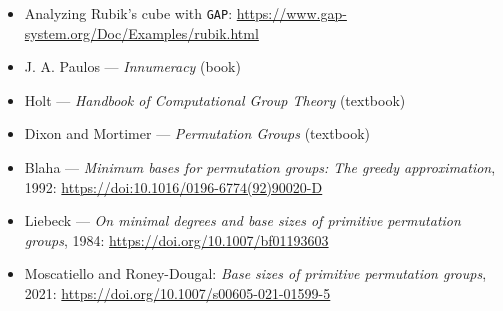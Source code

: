 \documentclass{beamer}
\begin{document}
\begin{slide}
    \small
    \begin{itemize}
        \item Analyzing Rubik's cube with \texttt{GAP}: \url{https://www.gap-system.org/Doc/Examples/rubik.html}
        \item J. A. Paulos --- \textit{Innumeracy} (book)
        \item Holt --- \textit{Handbook of Computational Group Theory} (textbook)
        \item Dixon and Mortimer --- \textit{Permutation Groups} (textbook)
        \item Blaha --- \textit{Minimum bases for permutation groups: The greedy approximation}, 1992: \url{https://doi:10.1016/0196-6774(92)90020-D}
        \item Liebeck --- \textit{On minimal degrees and base sizes of primitive permutation groups}, 1984: \url{https://doi.org/10.1007/bf01193603}
        \item Moscatiello and Roney-Dougal: \textit{Base sizes of primitive permutation groups}, 2021: \url{https://doi.org/10.1007/s00605-021-01599-5}
    \end{itemize}
\end{slide}


\end{document}

